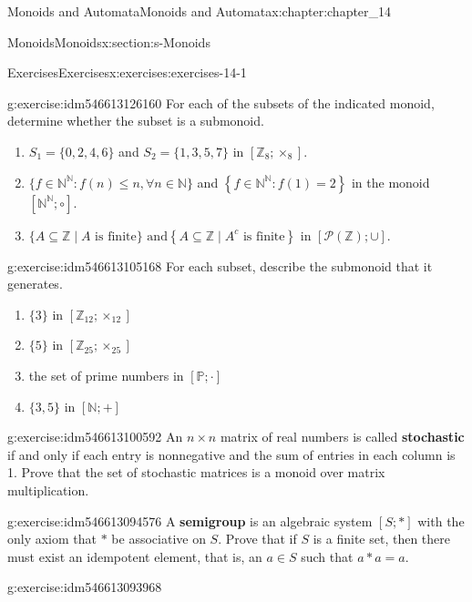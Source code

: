 \documentclass[oneside,10pt,]{book}
\newcommand{\terminology}[1]{\textbf{#1}}
\numberwithin{equation}{section}
\begin{document}
\begin{chapterptx}{Monoids and Automata}{}{Monoids and Automata}{}{}{x:chapter:chapter_14}
\begin{sectionptx}{Monoids}{}{Monoids}{}{}{x:section:s-Monoids}
\begin{exercises-subsection}{Exercises}{}{Exercises}{}{}{x:exercises:exercises-14-1}
\begin{divisionexercise}{1}{}{}{g:exercise:idm546613126160}%
For each of the subsets of the indicated monoid, determine whether the subset is a submonoid.%
\begin{enumerate}[label=(\alph*)]
\item{}\(S_1=\{0,2,4,6\}\) and  \(S_2=\{1,3,5,7\}\) in \([\mathbb{Z}_8;\times_8].\)%
\item{}\(\{f\in \mathbb{N}^{\mathbb{N}}:f(n) \leqslant n, \forall n \in \mathbb{N}\}\) and  \(\left\{f\in \mathbb{N}^{\mathbb{N}}:f(1)=2\right\}\) in the monoid \([\mathbb{N}^{\mathbb{N}};\circ]\).%
\item{}\(\{A\subseteq \mathbb{Z} \mid A \textrm{ is finite}\} \textrm{ and} \left\{A\subseteq \mathbb{Z} \mid A^c\textrm{ is} \textrm{ finite}\right\}\) in \([\mathcal{P}(\mathbb{Z});\cup].\)%
\end{enumerate}
%
\end{divisionexercise}%
\begin{divisionexercise}{2}{}{}{g:exercise:idm546613105168}%
For each subset, describe the submonoid that it generates.%
\begin{enumerate}[label=(\alph*)]
\item{}\(\{3\}\) in \([\mathbb{Z}_{12};\times_{12}]\)%
\item{}\(\{5\} \textrm{ in } [\mathbb{Z}_{25};\times_{25}]\)%
\item{}the set of prime numbers in \([\mathbb{P}; \cdot ]\)%
\item{}\(\{3,5\} \textrm{ in } [\mathbb{N}; +]\)%
\end{enumerate}
%
\end{divisionexercise}%
\begin{divisionexercise}{3}{}{}{g:exercise:idm546613100592}%
An \(n \times n\)  matrix of real numbers is called \terminology{stochastic} if and only if each entry is nonnegative and the sum of entries in each column is 1. Prove that the set of stochastic matrices is a monoid over matrix multiplication.%
\end{divisionexercise}%
\begin{divisionexercise}{4}{}{}{g:exercise:idm546613094576}%
A \terminology{semigroup} is an algebraic system \([S; *]\) with the only axiom that \(*\) be associative on \(S\). Prove that if \(S\) is a finite set, then there must exist an idempotent element, that is, an \(a \in  S\) such that \(a * a = a\).%
\end{divisionexercise}%
\begin{divisionexercise}{5}{}{}{g:exercise:idm546613093968}%

\end{divisionexercise}
\end{exercises-subsection}
\end{sectionptx}
\end{chapterptx}
\end{document}
